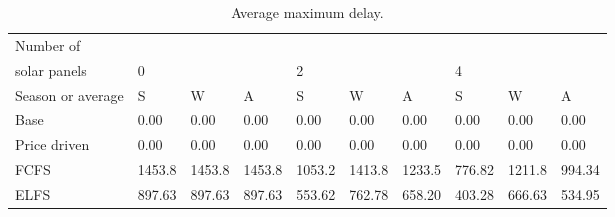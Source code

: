 \begin{table}[h]
\centering
\begin{tabular}{l|lll|lll|lll}Number of \\ solar panels&0& & &2& & &4& & \\ \hline
Season or average & S & W & A & S & W & A & S & W & A \\ \hline
Base&0.00&0.00&0.00&0.00&0.00&0.00&0.00&0.00&0.00 \\
Price driven&0.00&0.00&0.00&0.00&0.00&0.00&0.00&0.00&0.00 \\
FCFS&1453.8&1453.8&1453.8&1053.2&1413.8&1233.5&776.82&1211.8&994.34 \\
ELFS&897.63&897.63&897.63&553.62&762.78&658.20&403.28&666.63&534.95 \\
\end{tabular}
\caption{Average maximum delay.}
\label{avg max delay}
\end{table}
